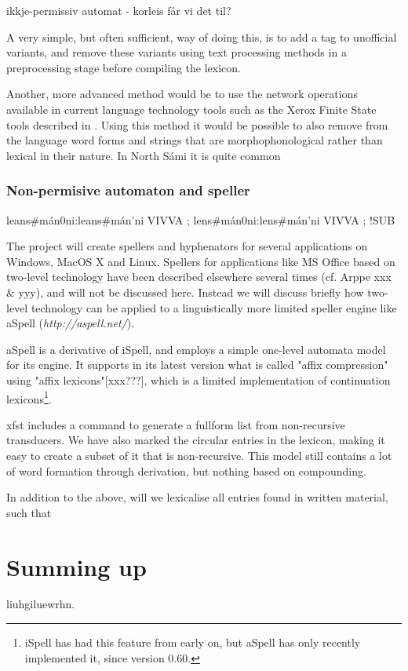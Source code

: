 \documentclass[a4paper,english]{article}
\begin{document}
ikkje-permissiv automat - korleis får vi det til?

A very simple, but often sufficient, way of doing this, is to add a tag to unofficial variants, and remove these variants using text processing methods in a preprocessing stage before compiling the lexicon.

Another, more advanced method would be to use the network operations available in current language technology tools such as the Xerox Finite State tools described in \cite{Beesley03}. Using this method it would be possible to also remove from the language word forms and strings that are morphophonological rather than lexical in their nature. In North Sámi it is quite common

\subsubsection{Non-permisive automaton and speller}


leans\#mán0ni:leans\#mán'ni VIVVA ;
lens\#mán0ni:lens\#mán'ni VIVVA ; !SUB


The project will create spellers and hyphenators for several applications on Windows, MacOS X and Linux. Spellers for applications like MS Office based on two-level technology have been described elsewhere several times (cf. Arppe xxx \& yyy), and will not be discussed here. Instead we will discuss briefly how two-level technology can be applied to a linguistically more limited speller engine like aSpell (\textit{http://aspell.net/}).

aSpell is a derivative of iSpell, and employs a simple one-level automata model for its engine. It supports in its latest version what is called "affix compression" using "affix lexicons"[xxx???], which is a limited implementation of continuation lexicons\footnote{iSpell has had this feature from early on, but aSpell has only recently implemented it, since version 0.60.}.

xfst includes a command to generate a fullform list from non-recursive transducers. We have also marked the circular entries in the lexicon, making it easy to create a subset of it that is non-recursive. This model still contains a lot of word formation through derivation, but nothing based on compounding.

In addition  to the above, will we lexicalise all entries found in written material, such that

\section{Summing up}

liuhgiluewrhn.

 



\end{document}
